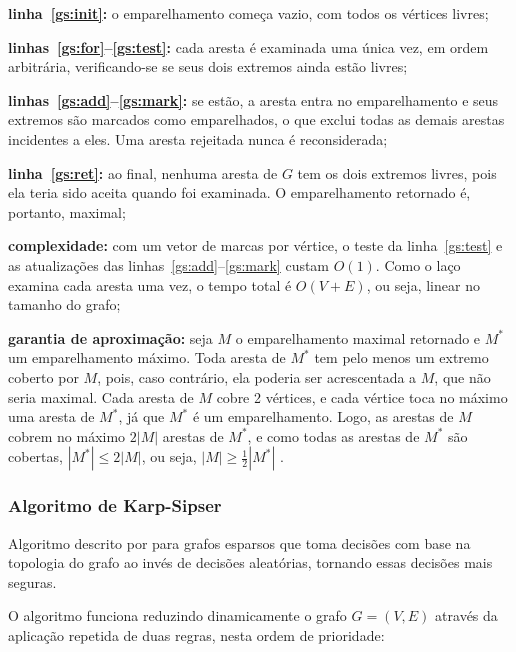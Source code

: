 \begin{alineas}
    \item \textbf{linha~\ref{gs:init}:} o emparelhamento começa vazio, com todos os vértices livres;
    \item \textbf{linhas~\ref{gs:for}--\ref{gs:test}:} cada aresta é examinada uma única vez, em ordem arbitrária, verificando-se se seus dois extremos ainda estão livres;
    \item \textbf{linhas~\ref{gs:add}--\ref{gs:mark}:} se estão, a aresta entra no emparelhamento e seus extremos são marcados como emparelhados, o que exclui todas as demais arestas incidentes a eles. Uma aresta rejeitada nunca é reconsiderada;
    \item \textbf{linha~\ref{gs:ret}:} ao final, nenhuma aresta de $G$ tem os dois extremos livres, pois ela teria sido aceita quando foi examinada. O emparelhamento retornado é, portanto, maximal;
    \item \textbf{complexidade:} com um vetor de marcas por vértice, o teste da linha~\ref{gs:test} e as atualizações das linhas~\ref{gs:add}--\ref{gs:mark} custam $O(1)$. Como o laço examina cada aresta uma vez, o tempo total é $O(V + E)$, ou seja, linear no tamanho do grafo;
    \item \textbf{garantia de aproximação:} seja $M$ o emparelhamento maximal retornado e $M^*$ um emparelhamento máximo. Toda aresta de $M^*$ tem pelo menos um extremo coberto por $M$, pois, caso contrário, ela poderia ser acrescentada a $M$, que não seria maximal. Cada aresta de $M$ cobre 2 vértices, e cada vértice toca no máximo uma aresta de $M^*$, já que $M^*$ é um emparelhamento. Logo, as arestas de $M$ cobrem no máximo $2|M|$ arestas de $M^*$, e como todas as arestas de $M^*$ são cobertas, $|M^*| \le 2|M|$, ou seja, $|M| \ge \frac{1}{2}|M^*|$ \cite{vazirani2001}.
\end{alineas}

\subsubsection{Algoritmo de Karp-Sipser}

Algoritmo descrito por  para grafos esparsos que toma decisões com base na topologia do grafo ao invés de decisões aleatórias, tornando essas decisões mais seguras.

O algoritmo funciona reduzindo dinamicamente o grafo $G=(V,E)$ através da aplicação repetida de duas regras, nesta ordem de prioridade:

